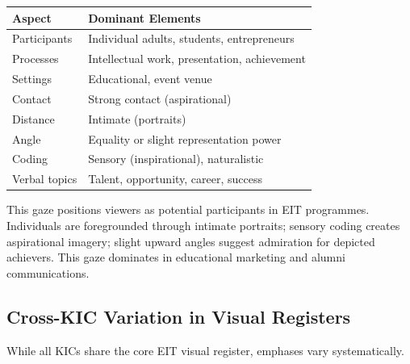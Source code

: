\documentclass[../main.tex]{subfiles}
\begin{document}
\begin{center}
\small
\begin{tabular}{ll}
\toprule
\textbf{Aspect} & \textbf{Dominant Elements} \\
\midrule
Participants & Individual adults, students, entrepreneurs \\
Processes & Intellectual work, presentation, achievement \\
Settings & Educational, event venue \\
Contact & Strong contact (aspirational) \\
Distance & Intimate (portraits) \\
Angle & Equality or slight representation power \\
Coding & Sensory (inspirational), naturalistic \\
Verbal topics & Talent, opportunity, career, success \\
\bottomrule
\end{tabular}
\end{center}

This gaze positions viewers as potential participants in EIT programmes. Individuals are foregrounded through intimate portraits; sensory coding creates aspirational imagery; slight upward angles suggest admiration for depicted achievers. This gaze dominates in educational marketing and alumni communications.

\subsection{Cross-KIC Variation in Visual Registers}

While all KICs share the core EIT visual register, emphases vary systematically.
\end{document}

